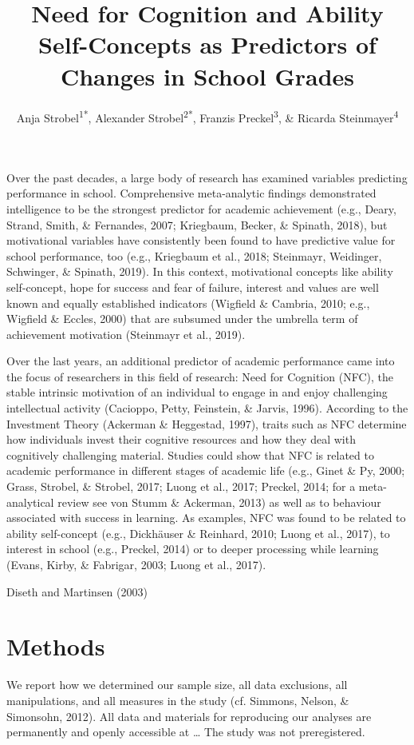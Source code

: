 \documentclass[
  man]{apa6}
\title{Need for Cognition and Ability Self-Concepts as Predictors of Changes in School Grades}
\author{Anja Strobel\textsuperscript{1*}, Alexander Strobel\textsuperscript{2*}, Franzis Preckel\textsuperscript{3}, \& Ricarda Steinmayer\textsuperscript{4}}
\date{}
\affiliation{\vspace{0.5cm}\textsuperscript{1} Department of Psychology, Chemnitz University of Technology, Chemnitz, Germany\\\textsuperscript{2} Faculty of Psychology, Technische Universität Dresden, Dresden, Germany\\\textsuperscript{3} Department of Psychology, University of Trier, Trier, Germany\\\textsuperscript{4} Department of Psychology, TU Dortmund University, Dortmund, Germany}
\begin{document}
\maketitle

Over the past decades, a large body of research has examined variables predicting performance in school. Comprehensive meta-analytic findings demonstrated intelligence to be the strongest predictor for academic achievement (e.g., Deary, Strand, Smith, \& Fernandes, 2007; Kriegbaum, Becker, \& Spinath, 2018), but motivational variables have consistently been found to have predictive value for school performance, too (e.g., Kriegbaum et al., 2018; Steinmayr, Weidinger, Schwinger, \& Spinath, 2019). In this context, motivational concepts like ability self-concept, hope for success and fear of failure, interest and values are well known and equally established indicators (Wigfield \& Cambria, 2010; e.g., Wigfield \& Eccles, 2000) that are subsumed under the umbrella term of achievement motivation (Steinmayr et al., 2019).

Over the last years, an additional predictor of academic performance came into the focus of researchers in this field of research: Need for Cognition (NFC), the stable intrinsic motivation of an individual to engage in and enjoy challenging intellectual activity (Cacioppo, Petty, Feinstein, \& Jarvis, 1996). According to the Investment Theory (Ackerman \& Heggestad, 1997), traits such as NFC determine how individuals invest their cognitive resources and how they deal with cognitively challenging material. Studies could show that NFC is related to academic performance in different stages of academic life (e.g., Ginet \& Py, 2000; Grass, Strobel, \& Strobel, 2017; Luong et al., 2017; Preckel, 2014; for a meta-analytical review see von Stumm \& Ackerman, 2013) as well as to behaviour associated with success in learning. As examples, NFC was found to be related to ability self-concept (e.g., Dickhäuser \& Reinhard, 2010; Luong et al., 2017), to interest in school (e.g., Preckel, 2014) or to deeper processing while learning (Evans, Kirby, \& Fabrigar, 2003; Luong et al., 2017).

Diseth and Martinsen (2003)

\hypertarget{methods}{%
\section{Methods}\label{methods}}

We report how we determined our sample size, all data exclusions, all manipulations, and all measures in the study (cf. Simmons, Nelson, \& Simonsohn, 2012). All data and materials for reproducing our analyses are permanently and openly accessible at \ldots{} The study was not preregistered.
\end{document}
